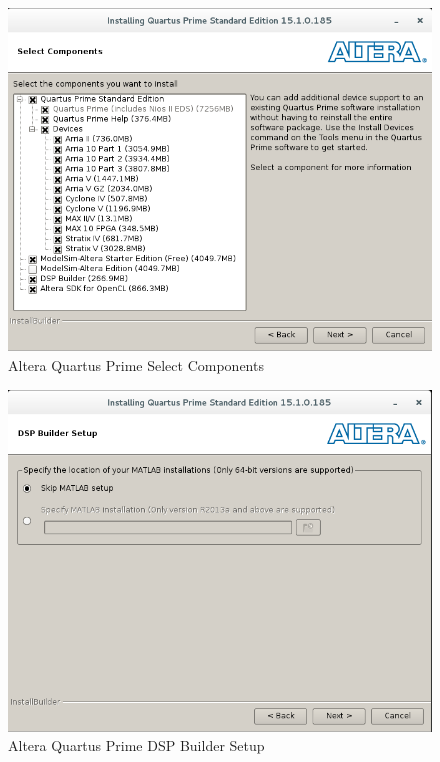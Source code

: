 \begin{flushleft}
\begin{enumerate}
\begin{figure}[H]
	\centerline{\includegraphics[scale=0.5]{figures/altera_install_4}}
	\caption{Altera Quartus Prime Select Components}
\end{figure}
\begin{figure}[H]
	\centerline{\includegraphics[scale=0.5]{figures/altera_install_5}}
	\caption{Altera Quartus Prime DSP Builder Setup}
\end{figure}
\begin{figure}[H]

\end{figure}
\end{enumerate}
\end{flushleft}
